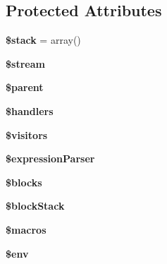 \subsection*{Protected Attributes}
\begin{DoxyCompactItemize}
\item 
\hypertarget{class_twig___parser_a6a0169b26b5301f906b1ec481b3f1eea}{}{\bfseries \$stack} = array()\label{class_twig___parser_a6a0169b26b5301f906b1ec481b3f1eea}

\item 
\hypertarget{class_twig___parser_aa658946a5d6cb700e35df1fc7854e7b3}{}{\bfseries \$stream}\label{class_twig___parser_aa658946a5d6cb700e35df1fc7854e7b3}

\item 
\hypertarget{class_twig___parser_a4e2313a4b35b72a06ac45fd38960f677}{}{\bfseries \$parent}\label{class_twig___parser_a4e2313a4b35b72a06ac45fd38960f677}

\item 
\hypertarget{class_twig___parser_ac01af86047396c863ebae81b8c8f7427}{}{\bfseries \$handlers}\label{class_twig___parser_ac01af86047396c863ebae81b8c8f7427}

\item 
\hypertarget{class_twig___parser_a63a73490fa0428629a602fd9042a95aa}{}{\bfseries \$visitors}\label{class_twig___parser_a63a73490fa0428629a602fd9042a95aa}

\item 
\hypertarget{class_twig___parser_a85cec3fd7a755262bc0d41009c83027e}{}{\bfseries \$expression\+Parser}\label{class_twig___parser_a85cec3fd7a755262bc0d41009c83027e}

\item 
\hypertarget{class_twig___parser_a320aeae1df42ee73ab4b3d9f7cf4ef3f}{}{\bfseries \$blocks}\label{class_twig___parser_a320aeae1df42ee73ab4b3d9f7cf4ef3f}

\item 
\hypertarget{class_twig___parser_a05fa28125b038667e94644c471349750}{}{\bfseries \$block\+Stack}\label{class_twig___parser_a05fa28125b038667e94644c471349750}

\item 
\hypertarget{class_twig___parser_aa11dc0c9db28ed82b4e1a0efb656d120}{}{\bfseries \$macros}\label{class_twig___parser_aa11dc0c9db28ed82b4e1a0efb656d120}

\item 
\hypertarget{class_twig___parser_aa99ce9ae015e958eef5782267276fbb4}{}{\bfseries \$env}\label{class_twig___parser_aa99ce9ae015e958eef5782267276fbb4}


\end{DoxyCompactItemize}
